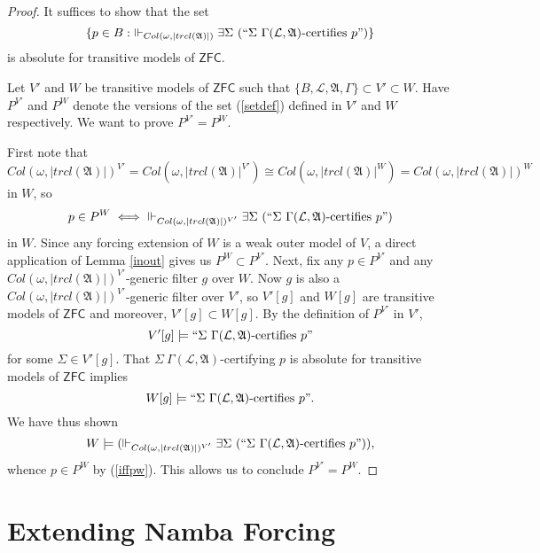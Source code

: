 \documentclass[12pt]{article}
\numberwithin{equation}{section}
\begin{document}
\begin{proof}
It suffices to show that the set 
\begin{equation}\label{setdef}
    \{p \in B : \ \Vdash_{Col(\omega, |trcl(\mathfrak{A})|)} \exists \Sigma \ (``\Sigma \ \Gamma(\mathcal{L}, \mathfrak{A}) \text{-certifies } p")\}
\end{equation}
is absolute for transitive models of $\mathsf{ZFC}$. 

Let $V'$ and $W$ be transitive models of $\mathsf{ZFC}$ such that $\{B, \mathcal{L}, \mathfrak{A}, \Gamma\} \subset V' \subset W$. Have $P^{V'}$ and $P^W$ denote the versions of the set (\ref{setdef}) defined in $V'$ and $W$ respectively. We want to prove $P^{V'} = P^W$. 

First note that $$ Col(\omega, |trcl(\mathfrak{A})|)^{V'} = Col(\omega, |trcl(\mathfrak{A})|^{V'}) \cong Col(\omega, |trcl(\mathfrak{A})|^W) = Col(\omega, |trcl(\mathfrak{A})|)^W$$ in $W$, so 
\begin{equation}\label{iffpw}
    p \in P^W \iff \ \Vdash_{Col(\omega, |trcl(\mathfrak{A})|)^{V'}} \exists \Sigma \ (``\Sigma \ \Gamma(\mathcal{L}, \mathfrak{A}) \text{-certifies } p")
\end{equation}
in $W$. Since any forcing extension of $W$ is a weak outer model of $V$, a direct application of Lemma \ref{inout} gives us $P^W \subset P^{V'}$. Next, fix any $p \in P^{V'}$ and any $Col(\omega, |trcl(\mathfrak{A})|)^{V'}$-generic filter $g$ over $W$. Now $g$ is also a $Col(\omega, |trcl(\mathfrak{A})|)^{V'}$-generic filter over $V'$, so $V'[g]$ and $W[g]$ are transitive models of $\mathsf{ZFC}$ and moreover, $V'[g] \subset W[g]$. By the definition of $P^{V'}$ in $V'$, $$V'[g] \models ``\Sigma \ \Gamma(\mathcal{L}, \mathfrak{A}) \text{-certifies } p"$$ for some $\Sigma \in V'[g]$. That $\Sigma \ \Gamma(\mathcal{L}, \mathfrak{A})$-certifying $p$ is absolute for transitive models of $\mathsf{ZFC}$ implies $$W[g] \models ``\Sigma \ \Gamma(\mathcal{L}, \mathfrak{A}) \text{-certifies } p".$$ We have thus shown $$W \models (\Vdash_{Col(\omega, |trcl(\mathfrak{A})|)^{V'}} \exists \Sigma \ (``\Sigma \ \Gamma(\mathcal{L}, \mathfrak{A}) \text{-certifies } p")),$$ whence $p \in P^W$ by (\ref{iffpw}). This allows us to conclude $P^{V'} = P^W$.
\end{proof}

\section{Extending Namba Forcing}\label{sect2}
\end{document}
